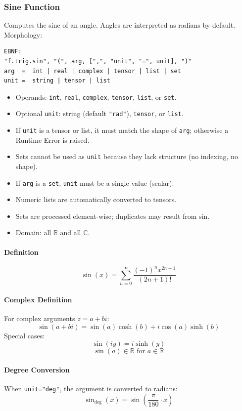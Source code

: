 \subsubsection{Sine Function}
Computes the sine of an angle. Angles are interpreted as radians by default.\\
Morphology:
\begin{verbatim}
EBNF:
"f.trig.sin", "(", arg, [",", "unit", "=", unit], ")"
arg  =  int | real | complex | tensor | list | set
unit =  string | tensor | list
\end{verbatim}
\begin{itemize}
\item Operands: \texttt{int}, \texttt{real}, \texttt{complex}, \texttt{tensor}, \texttt{list}, or \texttt{set}.
\item Optional \texttt{unit}: string (default \texttt{"rad"}), \texttt{tensor}, or \texttt{list}.
\item If \texttt{unit} is a tensor or list, it must match the shape of \texttt{arg}; otherwise a Runtime Error is raised.
\item Sets cannot be used as \texttt{unit} because they lack structure (no indexing, no shape).
\item If \texttt{arg} is a \texttt{set}, \texttt{unit} must be a single value (scalar).
\item Numeric lists are automatically converted to tensors.
\item Sets are processed element-wise; duplicates may result from sin.
\item Domain: all $\mathbb{R}$ and all $\mathbb{C}$.
\end{itemize}

\paragraph{Definition}
\[
\sin(x) = \sum_{n=0}^{\infty} \frac{(-1)^n x^{2n+1}}{(2n+1)!}
\]

\paragraph{Complex Definition}
For complex arguments $z = a + bi$:
\[
\sin(a + bi) = \sin(a)\cosh(b) + i\cos(a)\sinh(b)
\]
Special cases:
\[
\sin(iy) = i\sinh(y)
\]
\[
\sin(a) \in \mathbb{R} \text{ for } a \in \mathbb{R}
\]

\paragraph{Degree Conversion}
When \texttt{unit="deg"}, the argument is converted to radians:
\[
\sin_{\text{deg}}(x) = \sin\left(\frac{\pi}{180} \cdot x\right)
\]

